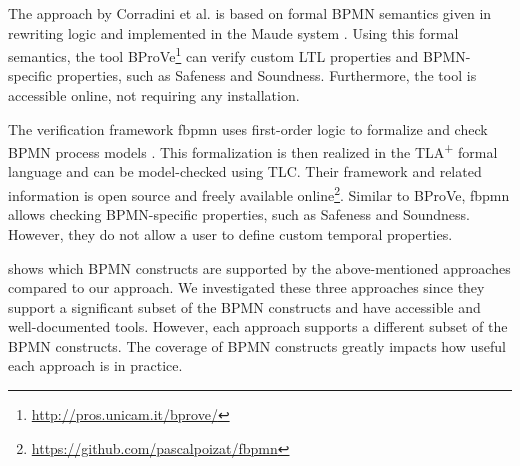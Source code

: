 \documentclass[submission, copyright, creativecommons]{eptcs}
\begin{document}
The approach by Corradini et al. is based on formal BPMN semantics given in rewriting logic and implemented in the Maude system \cite{corradiniFormalApproachAnalysis2021}.
Using this formal semantics, the tool BProVe\footnote{\url{http://pros.unicam.it/bprove/}} can verify custom LTL properties and BPMN-specific properties, such as Safeness and Soundness.
Furthermore, the tool is accessible online, not requiring any installation.

The verification framework \textsf{fbpmn} uses first-order logic to formalize and check BPMN process models \cite{houhouFirstOrderLogicVerification2022}.
This formalization is then realized in the TLA\textsuperscript{+} formal language and can be model-checked using TLC.
Their framework and related information is open source and freely available online\footnote{\url{https://github.com/pascalpoizat/fbpmn}}.
Similar to BProVe, \textsf{fbpmn} allows checking BPMN-specific properties, such as Safeness and Soundness.
However, they do not allow a user to define custom temporal properties.

 shows which BPMN constructs are supported by the above-mentioned  approaches compared to our approach.
We investigated these three approaches since they support a significant subset of the BPMN constructs and have accessible and well-documented tools.
However, each approach supports a different subset of the BPMN constructs.
The coverage of BPMN constructs greatly impacts how useful each approach is in practice.
\end{document}
